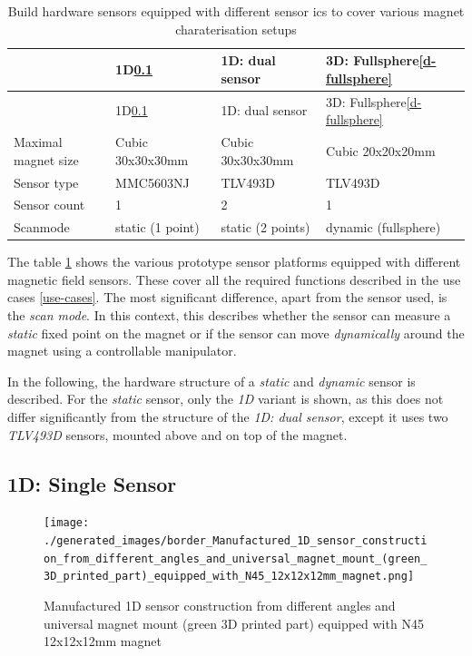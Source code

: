\begin{longtable}[]{@{}llll@{}}
\caption{Build hardware sensors equipped with different sensor \gls{ic}s
to cover various magnet charaterisation setups
\label{Build_hardware_sensors_equipped_with_different_sensor_(+ic)s_to_cover_various_magnet_charaterisation_setups.csv}}\tabularnewline
\toprule
& 1D\ref{d-single-sensor} & 1D: dual sensor & 3D:
Fullsphere\ref{d-fullsphere}\tabularnewline
\midrule
\endfirsthead
\toprule
& 1D\ref{d-single-sensor} & 1D: dual sensor & 3D:
Fullsphere\ref{d-fullsphere}\tabularnewline
\midrule
\endhead
Maximal magnet size & Cubic 30x30x30mm & Cubic 30x30x30mm & Cubic
20x20x20mm\tabularnewline
Sensor type & MMC5603NJ & TLV493D & TLV493D\tabularnewline
Sensor count & 1 & 2 & 1\tabularnewline
Scanmode & static (1 point) & static (2 points) & dynamic
(fullsphere)\tabularnewline
\bottomrule
\end{longtable}

The table
\ref{Build_hardware_sensors_equipped_with_different_sensor_(+ic)s_to_cover_various_magnet_charaterisation_setups.csv}
shows the various prototype sensor platforms equipped with different
magnetic field sensors. These cover all the required functions described
in the use cases \ref{use-cases}. The most significant difference, apart
from the sensor used, is the \emph{scan mode}. In this context, this
describes whether the sensor can measure a \emph{static} fixed point on
the magnet or if the sensor can move \emph{dynamically} around the
magnet using a controllable manipulator.

In the following, the hardware structure of a \emph{static} and
\emph{dynamic} sensor is described. For the \emph{static} sensor, only
the \emph{1D} variant is shown, as this does not differ significantly
from the structure of the \emph{1D: dual sensor}, except it uses two
\emph{TLV493D} sensors, mounted above and on top of the magnet.

\hypertarget{d-single-sensor}{%
\subsection{1D: Single Sensor}\label{d-single-sensor}}

\begin{figure}
\centering
\texttt{[image: ./generated\_images/border\_Manufactured\_1D\_sensor\_construction\_from\_different\_angles\_and\_universal\_magnet\_mount\_(green\_3D\_printed\_part)\_equipped\_with\_N45\_12x12x12mm\_magnet.png]}
\caption{Manufactured 1D sensor construction from different angles and
universal magnet mount (green 3D printed part) equipped with N45
12x12x12mm magnet
\label{Manufactured_1D_sensor_construction_from_different_angles_and_universal_magnet_mount_(green_3D_printed_part)_equipped_with_N45_12x12x12mm_magnet.png}}
\end{figure}

